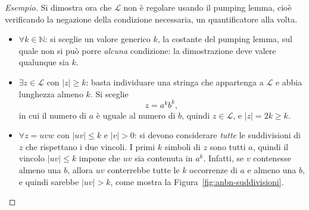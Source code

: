 \documentclass[a4paper, 11pt, oneside]{book}
\theoremstyle{formale}
\newenvironment{esempio}
    {\begin{proof}[\textit{Esempio}]\renewcommand{\qedsymbol}{$\diamond$}}
    {\end{proof}}
\begin{document}
\begin{esempio}
        Si dimostra ora che $\mathcal{L}$ non \`e regolare usando il pumping lemma, cio\`e
        verificando la negazione della condizione necessaria, un quantificatore alla volta.
        \begin{itemize}
            \item $\forall k \in \mathbb{N}$: si sceglie un valore generico $k$, la
                costante del pumping lemma, sul quale non si pu\`o porre \emph{alcuna}
                condizione: la dimostrazione deve valere qualunque sia $k$.
            \item $\exists z \in \mathcal{L}$ con $|z| \geq k$: basta individuare una
                stringa che appartenga a $\mathcal{L}$ e abbia lunghezza almeno $k$. Si
                sceglie
                \begin{equation*}
                    z = a^k b^k,
                \end{equation*}
                in cui il numero di $a$ \`e uguale al numero di $b$, quindi
                $z \in \mathcal{L}$, e $|z| = 2k \geq k$.
            \item $\forall z = uvw$ con $|uv| \leq k$ e $|v| > 0$: si devono considerare
                \emph{tutte} le suddivisioni di $z$ che rispettano i due vincoli. I primi
                $k$ simboli di $z$ sono tutti $a$, quindi il vincolo $|uv| \leq k$ impone
                che $uv$ sia contenuta in $a^k$. Infatti, se $v$ contenesse almeno una $b$,
                allora $uv$ conterrebbe tutte le $k$ occorrenze di $a$ e almeno una $b$, e
                quindi sarebbe $|uv| > k$, come mostra la
                Figura~\ref{fig:anbn-suddivisioni}.
        \end{itemize}

        \begin{figure}[H]
            \centering
\end{figure}
\end{esempio}
\end{document}
